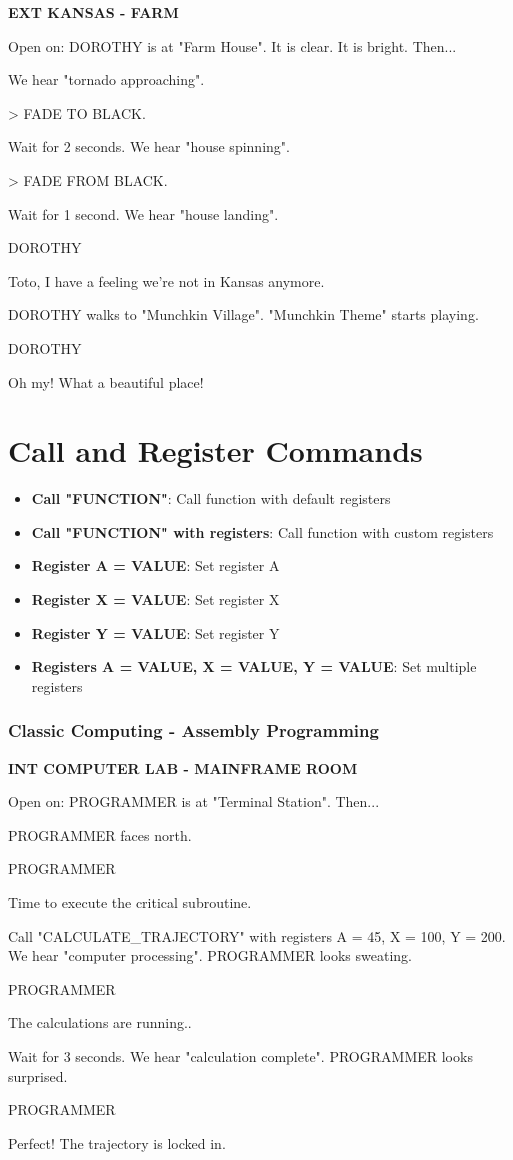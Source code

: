 \documentclass[11pt,letterpaper,oldstylefigures]{memoir}
\newcommand{\slugline}[1]{\nobreak\textbf{\MakeUppercase{#1}}\par\nobreak\vspace{1\baselineskip}}
\newcommand{\speaker}[1]{\nobreak\hspace*{0.333\textwidth}\MakeUppercase{#1}\par\nobreak\vspace{0.5\baselineskip}}
\newcommand{\dialogue}[1]{\nobreak\hspace*{0.25\textwidth}\begin{minipage}{0.5\textwidth}#1\end{minipage}\par\vspace{1\baselineskip}}
\newcommand{\stagedir}[1]{#1\par\vspace{1\baselineskip}}
\newenvironment{FountainExample}
  {\begingroup
  \ttfamily\small
   \setlength{\parindent}{0pt}
  \setlength{\parskip}{0.5em}
  \allowdisplaybreaks
  \setlength{\displaywidowpenalty}{0}
  \setlength{\widowpenalty}{0}
  \setlength{\clubpenalty}{0}
  \setlength{\interlinepenalty}{0}
}
  {\endgroup}
\newcommand{\sceneendcmd}[1]{\begin{flushright}\ttfamily #1\end{flushright}}
\newcommand{\fountain}[1]{\textbf{#1}}
\begin{document}
\begin{FountainExample}
\slugline{EXT KANSAS - FARM}

\stagedir{Open on: DOROTHY is at "Farm House". It is clear. It is bright. Then...}

\stagedir{We hear "tornado approaching".}

\sceneendcmd{> FADE TO BLACK.}
\stagedir{Wait for 2 seconds. We hear "house spinning".}
\sceneendcmd{> FADE FROM BLACK.}
\stagedir{Wait for 1 second. We hear "house landing".}

\speaker{DOROTHY}
\dialogue{Toto, I have a feeling we're not in Kansas anymore.}

\stagedir{DOROTHY walks to "Munchkin Village". "Munchkin Theme" starts playing.}

\speaker{DOROTHY}
\dialogue{Oh my! What a beautiful place!}
\end{FountainExample}

\section{Call and Register Commands}
\begin{itemize}
\item \fountain{Call "FUNCTION"}: Call function with default registers
\item \fountain{Call "FUNCTION" with registers}: Call function with custom registers
\item \fountain{Register A = VALUE}: Set register A
\item \fountain{Register X = VALUE}: Set register X
\item \fountain{Register Y = VALUE}: Set register Y
\item \fountain{Registers A = VALUE, X = VALUE, Y = VALUE}: Set multiple registers
\end{itemize}

\subsubsection*{Classic Computing - Assembly Programming}
\label{ex:classic-computing-assembly-programming}

\begin{FountainExample}
\slugline{INT COMPUTER LAB - MAINFRAME ROOM}

\stagedir{Open on: PROGRAMMER is at "Terminal Station". Then...}

\stagedir{PROGRAMMER faces north.}

\speaker{PROGRAMMER}
\dialogue{Time to execute the critical subroutine.}

\stagedir{Call "CALCULATE\_TRAJECTORY" with registers A = 45, X = 100, Y = 200. We hear "computer processing". PROGRAMMER looks sweating.}

\speaker{PROGRAMMER}
\dialogue{The calculations are running..}

\stagedir{Wait for 3 seconds. We hear "calculation complete". PROGRAMMER looks surprised.}

\speaker{PROGRAMMER}
\dialogue{Perfect! The trajectory is locked in.}
\end{FountainExample}
\end{document}
